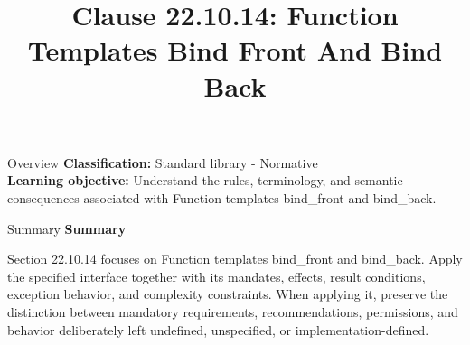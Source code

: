 \documentclass[10pt,letterpaper]{article}
\title{Clause 22.10.14: Function Templates Bind Front And Bind Back}
\author{}
\date{}
\begin{document}
\maketitle
\begin{CornellOverviewBox}{Overview}
\textbf{Classification:} Standard library - Normative\\[2pt]
\textbf{Learning objective:} Understand the rules, terminology, and semantic consequences associated with Function templates bind\_front and bind\_back.
\end{CornellOverviewBox}\begin{CornellSummaryBox}{Summary}
{\sffamily\bfseries\color{Accent} Summary}\par\vspace{3pt}Section 22.10.14 focuses on Function templates bind\_front and bind\_back. Apply the specified interface together with its mandates, effects, result conditions, exception behavior, and complexity constraints. When applying it, preserve the distinction between mandatory requirements, recommendations, permissions, and behavior deliberately left undefined, unspecified, or implementation-defined.
\end{CornellSummaryBox}
\end{document}
